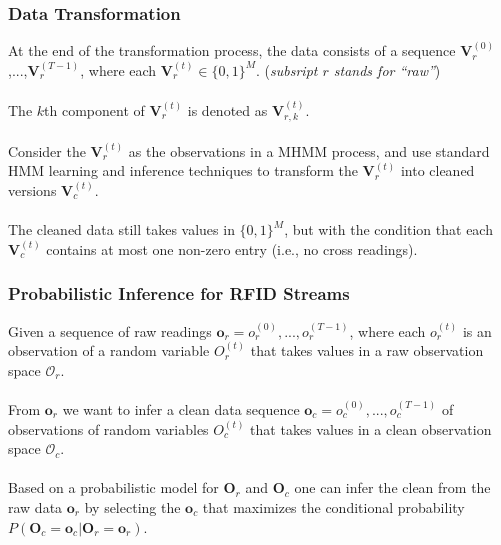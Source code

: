\begin{frame}
\begin{columns}
\end{columns}

\end{frame}


\begin{frame}
\frametitle{Data Transformation}

At the end of the transformation process, the data consists of a sequence $\mathbf{V}_r^{(0)}$,...,$\mathbf{V}_r^{(T-1)}$, where each $\mathbf{V}_r^{(t)} \in \{ 0, 1 \}^M$. (\textit{subsript $r$ stands for ``raw''}) \\~\\

The $k$th component of $\mathbf{V}_r^{(t)}$ is denoted as $\mathbf{V}_{r,k}^{(t)}$. \\~\\

Consider the $\mathbf{V}_r^{(t)}$ as the observations in a MHMM process, and use standard HMM learning and inference techniques to transform the $\mathbf{V}_r^{(t)}$ into cleaned versions $\mathbf{V}_c^{(t)}$. \\~\\

The cleaned data still takes values in $\{ 0, 1 \}^M$, but with the condition that each $\mathbf{V}_c^{(t)}$ contains at most one non-zero entry (i.e., no cross readings).

\end{frame}


\begin{frame}
\frametitle{Probabilistic Inference for RFID Streams}

Given a sequence of raw readings $\mathbf{o}_r = o^{(0)}_r,...,o^{(T-1)}_r$, where each $o^{(t)}_r$ is an observation of a random variable $O^{(t)}_r$ that takes values in a raw observation space $\mathcal{O}_r$. \\~\\

From $\mathbf{o}_r$ we want to infer a clean data sequence $\mathbf{o}_c = o^{(0)}_c,...,o^{(T-1)}_c$ of observations of random variables $O^{(t)}_c$ that takes values in a clean observation space $\mathcal{O}_c$. \\~\\

Based on a probabilistic model for $\mathbf{O}_r$ and $\mathbf{O}_c$ one can infer the clean from the raw data $\mathbf{o}_r$ by selecting the $\mathbf{o}_c$ that maximizes the conditional probability $P(\mathbf{O}_c = \mathbf{o}_c | \mathbf{O}_r = \mathbf{o}_r)$. \\~\\

\end{frame}

